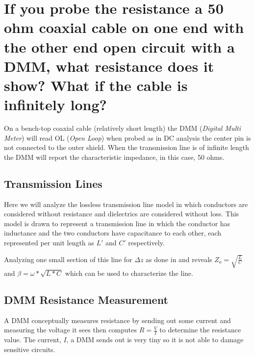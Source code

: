 \documentclass[main.tex]{subfiles}
\begin{document}
\section{If you probe the resistance a 50 ohm coaxial cable on one end with the other end open circuit with a DMM, what resistance does it show? What if the cable is infinitely long?}

\spoilerline


\noindent On a bench-top coaxial cable (relatively short length) the DMM (\textit{Digital Multi Meter}) will read OL (\textit{Open Loop}) when probed as in DC analysis the center pin is not connected to the outer shield. When the transmission line is of infinite length the DMM will report the characteristic impedance, in this case, 50 ohms.

\subsection{Transmission Lines}
Here we will analyze the lossless transmission line model in which conductors are considered without resistance and dielectrics are considered without loss. This model is drawn to represent a transmission line in which the conductor has inductance and the two conductors have capacitance to each other, each represented per unit length as $L\prime$ and $C\prime$ respectively.


Analyzing one small section of this line for $\Delta z$ as done in  and  reveals $Z_o = \sqrt{\frac{L}{C}}$ and $\beta = \omega * \sqrt{L*C}$ which can be used to characterize the line.

\subsection{DMM Resistance Measurement}
A DMM conceptually measures resistance by sending out some current and measuring the voltage it sees then computes $R = \frac{V}{I}$ to determine the resistance value. The current, $I$, a DMM sends out is very tiny so it is not able to damage sensitive circuits. 
\end{document}
